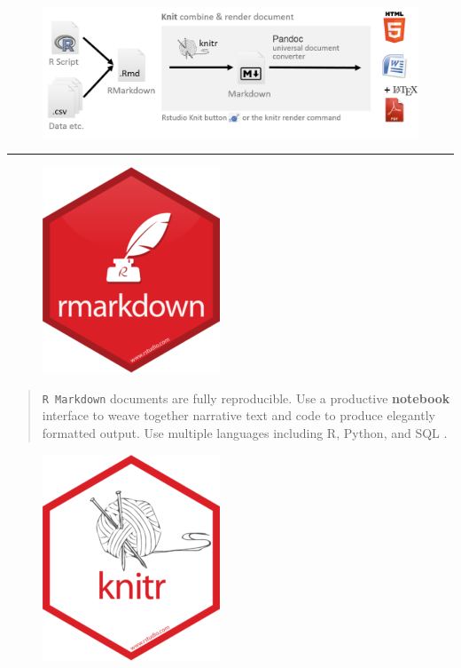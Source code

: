 \documentclass[]{book}
\begin{document}
\begin{figure}
\centering
\includegraphics{img/processRStudio.png}
\caption{}
\end{figure}

\begin{center}\rule{0.5\linewidth}{\linethickness}\end{center}

\begin{figure}
\centering
\includegraphics{img/hex/rmarkdown-200x232.png}
\caption{}
\end{figure}

\begin{quote}
\texttt{R\ Markdown} documents are fully reproducible. Use a productive
\textbf{notebook} interface to weave together narrative text and code to
produce elegantly formatted output. Use multiple languages including R,
Python, and SQL \citep{R-rmarkdown}.
\end{quote}

\begin{figure}
\centering
\includegraphics{img/hex/knitr-200x232.png}
\caption{}
\end{figure}
\end{document}
